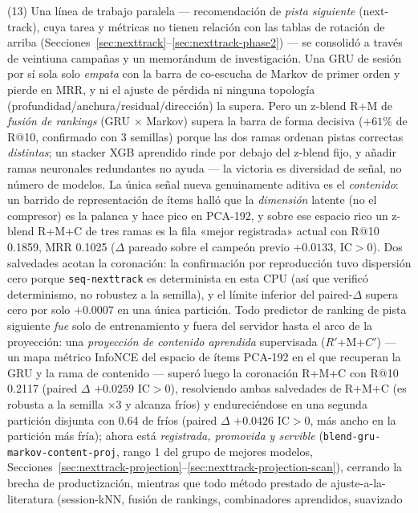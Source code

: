 \documentclass[11pt]{article}
\newcommand{\Rp}{\ensuremath{R'}}
\newcommand{\Cp}{\ensuremath{C'}}
\begin{document}
(13) Una línea de trabajo paralela --- recomendación de \emph{pista siguiente}
(next-track), cuya tarea y métricas no tienen relación con las tablas de rotación de
arriba (Secciones~\ref{sec:nexttrack}--\ref{sec:nexttrack-phase2}) --- se consolidó a
través de veintiuna campañas y un memorándum de investigación. Una GRU de sesión por sí sola solo \emph{empata} con la
barra de co-escucha de Markov de primer orden y pierde en MRR, y ni el ajuste de
pérdida ni ninguna topología (profundidad/anchura/residual/dirección) la supera.
Pero un z-blend R+M de \emph{fusión de rankings} (GRU $\times$ Markov) supera la
barra de forma decisiva ($+61\%$ de R@10, confirmado con 3 semillas) porque las dos
ramas ordenan pistas correctas \emph{distintas}; un stacker XGB aprendido rinde por
debajo del z-blend fijo, y añadir ramas neuronales redundantes no ayuda --- la
victoria es diversidad de señal, no número de modelos. La única señal nueva
genuinamente aditiva es el \emph{contenido}: un barrido de representación de ítems
halló que la \emph{dimensión} latente (no el compresor) es la palanca y hace pico en
PCA-192, y sobre ese espacio rico un z-blend R+M+C de tres ramas es la fila «mejor
registrada» actual con R@10 \num{0.1859}, MRR \num{0.1025} ($\Delta$ pareado sobre el
campeón previo $+\num{0.0133}$, IC$>$0). Dos salvedades acotan la coronación: la
confirmación por reproducción tuvo dispersión cero porque \texttt{seq-nexttrack} es
determinista en esta CPU (así que verificó determinismo, no robustez a la semilla), y
el límite inferior del paired-$\Delta$ supera cero por solo $+\num{0.0007}$ en una
única partición. Todo predictor de ranking de pista siguiente \emph{fue} solo de
entrenamiento y fuera del servidor hasta el arco de la proyección: una \emph{proyección
de contenido aprendida} supervisada (\Rp+M+\Cp) --- un mapa métrico InfoNCE del espacio de
ítems PCA-192 en el que recuperan la GRU y la rama de contenido --- superó luego la
coronación R+M+C con R@10 \num{0.2117} (paired $\Delta$ $+\num{0.0259}$ IC$>$0),
resolviendo ambas salvedades de R+M+C (es robusta a la semilla $\times$3 y alcanza fríos) y
endureciéndose en una segunda partición disjunta con 0.64 de fríos (paired $\Delta$
$+\num{0.0426}$ IC$>$0, más ancho en la partición más fría); ahora está \emph{registrada,
promovida y servible} (\texttt{blend-gru-markov-content-proj}, rango 1 del grupo de mejores
modelos, Secciones~\ref{sec:nexttrack-projection}--\ref{sec:nexttrack-projection-scan}),
cerrando la brecha de productización, mientras que todo método prestado de
ajuste-a-la-literatura (session-kNN, fusión de rankings, combinadores aprendidos, suavizado
\end{document}
